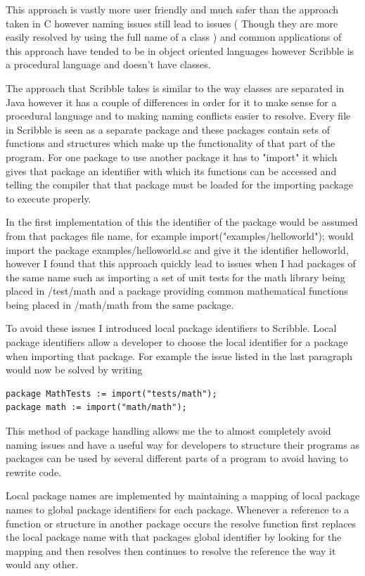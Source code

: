 \documentclass[]{final_report}
\begin{document}
This approach is vastly more user friendly and much safer than the approach taken in C however naming issues still lead to issues ( Though they are more easily resolved by using the full name of a class ) and common applications of this approach have tended to be in object oriented languages however Scribble is a procedural language and doesn't have classes.

The approach that Scribble takes is similar to the way classes are separated in Java however it has a couple of differences in order for it to make sense for a procedural language and to making naming conflicts easier to resolve. Every file in Scribble is seen as a separate package and these packages contain sets of functions and structures which make up the functionality of that part of the program. For one package to use another package it has to "import" it which gives that package an identifier with which its functions can be accessed and telling the compiler that that package must be loaded for the importing package to execute properly.

In the first implementation of this the identifier of the package would be assumed from that packages file name, for example import("examples/helloworld"); would import the package examples/helloworld.sc and give it the identifier helloworld, however I found that this approach quickly lead to issues when I had packages of the same name such as importing a set of unit tests for the math library being placed in /test/math and a package providing common mathematical functions being placed in /math/math from the same package. 

To avoid these issues I introduced local package identifiers to Scribble. Local package identifiers allow a developer to choose the local identifier for a package when importing that package. For example the issue listed in the last paragraph would now be solved by writing
\begin{verbatim}
package MathTests := import("tests/math");
package math := import("math/math");
\end{verbatim}

This method of package handling allows me the to almost completely avoid naming issues and have a useful way for developers to structure their programs as packages can be used by several different parts of a program to avoid having to rewrite code.

Local package names are implemented by maintaining a mapping of local package names to global package identifiers for each package. Whenever a reference to a function or structure in another package occurs the resolve function first replaces the local package name with that packages global identifier by looking for the mapping and then resolves then continues to resolve the reference the way it would any other. 
\end{document}

